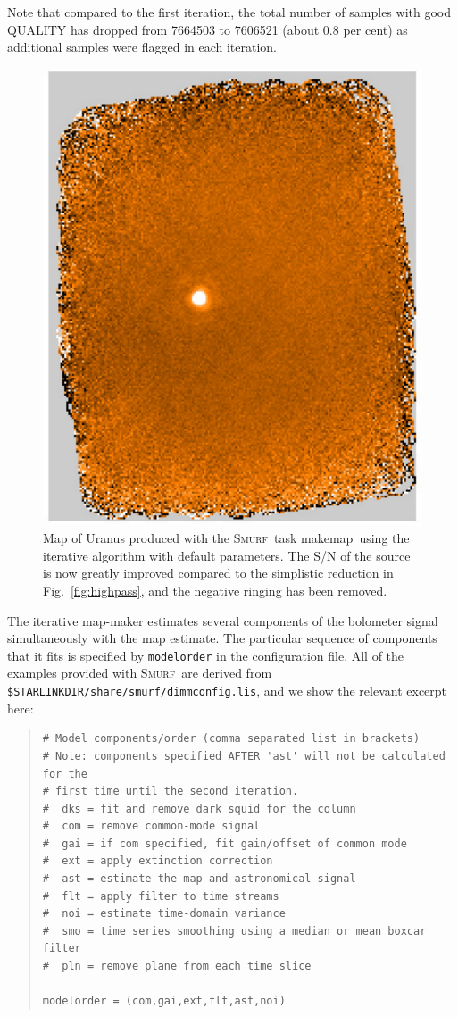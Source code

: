 \documentclass[twoside,11pt]{article}
\newcommand{\xref}[3]{#1}
\renewcommand{\_}{\texttt{\symbol{95}}}
\newenvironment{myquote}{\begin{quote}\begin{small}}{\end{small}\end{quote}}
\newcommand{\smurf}{\xref{\textsc{Smurf}}{sun258}{}}
\newcommand{\task}[1]{\textsf{#1}}
\newcommand{\makemap}{\xref{\task{makemap}}{sun258}{MAKEMAP}}
\begin{document}
Note that compared to the first iteration, the total number of samples
with good QUALITY has dropped from 7664503 to 7606521 (about 0.8 per cent) as
additional samples were flagged in each iteration.

\begin{figure}
\begin{center}
\includegraphics[width=0.5\linewidth]{sc19_map_iterate}
\caption{Map of Uranus produced with the \smurf\ task \makemap\ using
  the iterative algorithm with default parameters. The S/N of the
  source is now greatly improved compared to the simplistic reduction
  in Fig.~\ref{fig:highpass}, and the negative ringing has been
  removed.}
\label{fig:itermap}
\end{center}
\end{figure}

The iterative map-maker estimates several components of the bolometer
signal simultaneously with the map estimate. The particular sequence
of components that it fits is specified by \texttt{modelorder} in the
configuration file. All of the examples provided with \smurf\ are
derived from \texttt{\$STARLINK\_DIR/share/smurf/dimmconfig.lis}, and
we show the relevant excerpt here:

\begin{myquote}
\begin{verbatim}
# Model components/order (comma separated list in brackets)
# Note: components specified AFTER 'ast' will not be calculated for the
# first time until the second iteration.
#  dks = fit and remove dark squid for the column
#  com = remove common-mode signal
#  gai = if com specified, fit gain/offset of common mode
#  ext = apply extinction correction
#  ast = estimate the map and astronomical signal
#  flt = apply filter to time streams
#  noi = estimate time-domain variance
#  smo = time series smoothing using a median or mean boxcar filter
#  pln = remove plane from each time slice

modelorder = (com,gai,ext,flt,ast,noi)
\end{verbatim}
\end{myquote}
\end{document}
